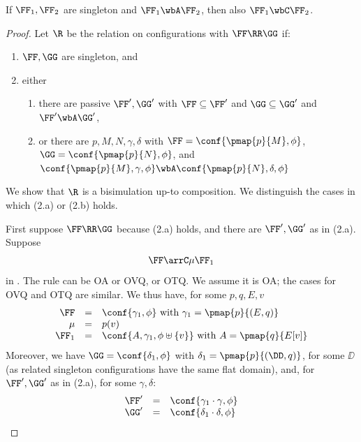 \begin{lemma}
\label{l:CBNOGS_COGS}
If $\FF_1, \FF_2  $ are singleton and 
$\FF_1 \wbA \FF_2  $, then also $\FF_1 \wbC \FF_2$. 
\end{lemma}  

\begin{proof}
Let $\R $ be the relation on configurations with $\FF \RR \GG$ if:
\begin{enumerate}
\item $\FF,\GG$ are singleton, and
\item  either 
\begin{enumerate}
\item
there are passive  $\FF', \GG'$ with $\FF \subseteq \FF'$ and $\GG \subseteq \GG'$ and $\FF' \wbA
  \GG'$,
\item   or 
there are $p,M,N,  \gamma , \delta $ with
$\FF = \conf{\pmap{p}{M},\phi}$,  
$\GG = \conf{\pmap{p}{N},\phi}$, and 
$\conf{\pmap{p}{M}, \gamma,\phi } \wbA 
\conf{\pmap{p}{N}, \delta,\phi  } $
\end{enumerate} 
\end{enumerate}


We show that $\R$ is  a bisimulation up-to
  composition.
We distinguish the cases in which (2.a) or (2.b) holds.


First suppose $\FF \RR \GG$ because (2.a) holds, and there are $\FF',\GG'$ as in (2.a).
Suppose 
\begin{equation}
\label{e:CBNKoaH}
 \FF \arrC  \mu \FF_1 
\end{equation} 
in \COGS.  The rule can be OA or OVQ, or OTQ.  We assume it is OA; the cases  for  OVQ and
OTQ are similar.  
We thus have, for some $p,q,E,v$ 
$$
\begin{array}{rcl}
 \FF &=&  \conf{ \gamma_1 ,\phi} \mbox{ with }  \gamma_1 =    \pmap{p}{(E,q)} \\
\mu & = & p(v) \\
\FF_1 & = & \conf{A, \gamma_1, \phi \uplus \{v\}} \mbox{ with }  A = \pmap{q}{E[v]}
\end{array} 
$$
Moreover,  we have $\GG = \conf{ \delta_1,\phi }$  with $  \delta_1 =    \pmap{p}{(\DD,q)}$, for
some $\DD$ (as related singleton configurations have the same flat domain), and, for
$\FF',\GG'$ as in (2.a), for some $\gamma, \delta $:  
$$
\begin{array}{rcl}
\FF' & = & \conf{ \gamma_1 \cdot \gamma  ,\phi} \\ 
\GG' & = & \conf{ \delta_1 \cdot \delta  ,\phi} 
\end{array} $$



\end{proof}
